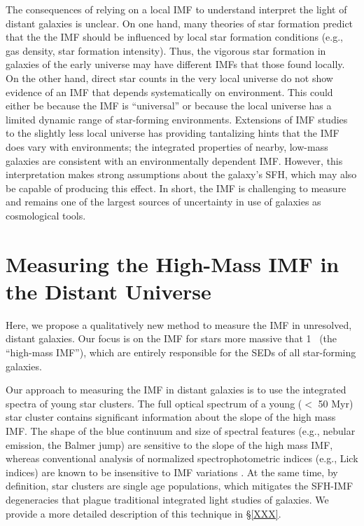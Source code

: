 \documentclass[11pt,preprint]{aastex}
\begin{document}
The consequences of relying on a local IMF to understand interpret the light of distant galaxies is unclear.  On one hand, many theories of star formation predict that the the IMF should be influenced by local star formation conditions (e.g., gas density, star formation intensity).  Thus, the vigorous star formation in galaxies of the early universe may have different IMFs that those found locally.  On the other hand, direct star counts in the very local universe do not show evidence of an IMF that depends systematically on environment. This could either be because the IMF is ``universal'' or because the local universe has a limited dynamic range of star-forming environments.  Extensions of IMF studies to the slightly less local universe has providing tantalizing hints that the IMF does vary with environments; the integrated properties of nearby, low-mass galaxies are consistent with an environmentally dependent IMF.  However, this interpretation makes strong assumptions about the galaxy's SFH, which may also be capable of producing this effect.  In short, the IMF is challenging to measure and remains one of the largest sources of uncertainty in use of galaxies as cosmological tools.


\section{Measuring the High-Mass IMF in the Distant Universe}

Here, we propose a qualitatively new method to measure the IMF in unresolved, distant galaxies.  Our focus is on the IMF for stars more massive that 1 \msun\ (the ``high-mass IMF''), which are entirely responsible for the SEDs of all star-forming galaxies.

Our approach to measuring the IMF in distant galaxies is to use the integrated spectra of young star clusters. The full optical spectrum of a young ($<$ 50 Myr) star cluster contains significant information about the slope of the high mass IMF.  The shape of the blue continuum and size of spectral features (e.g., nebular emission, the Balmer jump) are sensitive to the slope of the high mass IMF, whereas conventional analysis of normalized spectrophotometric indices (e.g., Lick indices) are known to be insensitive to IMF variations \citep[e.g.,][]{kol08}.  At the same time, by definition, star clusters are single age populations, which mitigates the SFH-IMF degeneracies that plague traditional integrated light studies of galaxies.  We provide a more detailed description of this technique in \S \ref{XXX}.  
\end{document}
